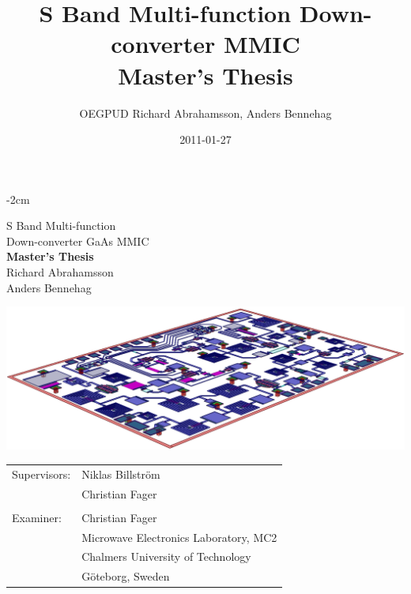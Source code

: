 \ifdefined\saab
	\title{S Band Multi-function Down-converter MMIC \\ Master's Thesis}
	\author{OEGPUD Richard Abrahamsson, Anders Bennehag}
	\date{2011-01-27}
	\documentreference{}
		
	\begin{adjustwidth}{}{-2cm}
	\begin{center}
	\vspace*{25pt}
	{\Huge S Band Multi-function \\
	\vspace*{5pt}
	Down-converter GaAs MMIC} \\
	\vspace{40pt}
	{\Large \textbf{Master's Thesis} \\
	Richard Abrahamsson \\
	\vspace{2pt}
	Anders Bennehag} \\
	\vspace{30pt}
	
	\vspace{40pt}

	\includegraphics[width=1.2\textwidth]{fig/front_v3}
	
	\vfill
	\begin{tabular}{ll}
		Supervisors: & Niklas Billström \\
					 & Christian Fager \\
					 & \\
		Examiner:	 & Christian Fager \\
					 & Microwave Electronics Laboratory, MC2 \\
					 & Chalmers University of Technology \\
					 & Göteborg, Sweden
	\end{tabular}
	\end{center}
	\end{adjustwidth}
	
